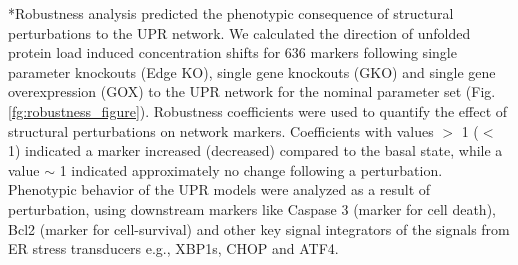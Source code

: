 \documentclass[12pt]{article}
\makeatletter
\renewcommand\subsection{\@startsection
	{subsection}{2}{0mm}
	{-0.05in}
	{-0.5\baselineskip}
	{\normalfont\normalsize\bfseries}}
\makeatother
\begin{document}
\subsection*{Robustness analysis predicted the phenotypic consequence of structural perturbations to the UPR network.} We calculated the direction of unfolded protein load induced concentration shifts for 636 markers following single parameter knockouts (Edge KO), single gene knockouts (GKO) and single gene overexpression (GOX) to the UPR network for the nominal parameter set (Fig. \ref{fg:robustness_figure}). Robustness coefficients were used to quantify the effect of structural perturbations on network markers. Coefficients with values $>$ 1 ($<$ 1) indicated a marker increased (decreased) compared to the basal state, while a value $\sim$ 1 indicated approximately no change following a perturbation. Phenotypic behavior of the UPR models were analyzed as a result of perturbation, using downstream markers like Caspase 3 (marker for cell death), Bcl2 (marker for cell-survival) and other key signal integrators of the signals from ER stress transducers e.g., XBP1s, CHOP and ATF4.
\end{document}
